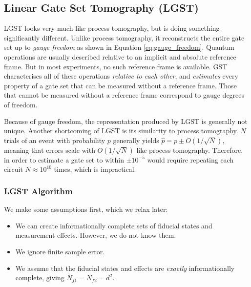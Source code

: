 \subsection{Linear Gate Set Tomography (LGST)}

\ac{LGST} looks very much like process tomography, but is doing something significantly different.
Unlike process tomography, it reconstructs the entire gate set up to \textit{gauge freedom} as shown
in Equation \ref{eq:gauge_freedom}. Quantum operations are usually described relative to an implicit
and absolute reference frame. But in most experiments, no such reference frame is available. GST
characterises all of these operations \textit{relative to each other}, and \textit{estimates} every
property of a gate set that can be measured without a reference frame. Those that cannot be measured
without a reference frame correspond to gauge degrees of freedom.

Because of gauge freedom, the representation produced by \ac{LGST} is generally not unique. Another
shortcoming of \ac{LGST} is its similarity to process tomography. $N$ trials of an event with
probability $p$ generally yields $\hat{p} = p \pm O(1 / \sqrt{N})$, meaning that errors scale with
$O(1 / \sqrt{N})$ like process tomography. Therefore, in order to estimate a gate set to within $\pm
10^{-5}$ would require repeating each circuit $N \approx 10^{10}$ times, which is impractical.


\subsubsection{LGST Algorithm}

We make some assumptions first, which we relax later:
\begin{itemize}
    \item We can create informationally complete sets of fiducial states and measurement effects.
    However, we do not know them.
    \item We ignore finite sample error.
    \item We assume that the fiducial states and effects are \textit{exactly} informationally
    complete, giving $N_{f1} = N_{f2} = d^2$.
\end{itemize}

